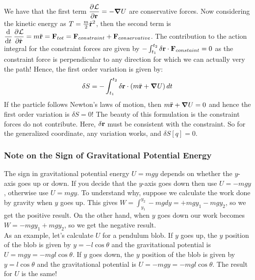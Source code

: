 We have that the first term $\dpd{\LL}{\v{r}} = -\grad{U}$ are conservative forces. Now considering the kinetic energy as $T = \frac{m}{2}\dot{\mathbf{r}}^2$, then the second term is $\dod{}{t}\dpd{\LL}{\dot{\v{r}}} = m\ddot{\v{r}} = \v{F}_{tot} = \v{F}_{constraint} + \v{F}_{conservative}$. The contribution to the action integral for the constraint forces are given by $-\int_{t_1}^{t_2}\delta\mathbf{r}\cdot\mathbf{F}_{constaint} = 0$ as the constraint force is perpendicular to any direction for which we can actually very the path! Hence, the first order variation is given by:
\[\delta S = -\int_{t_1}^{t_2}\delta\mathbf{r}\cdot\left(m\ddot{\mathbf{r}} + \grad{U}\right)dt\]
If the particle follows Newton's laws of motion, then $m\ddot{\mathbf{r}} + \grad{U} = 0$ and hence the first order variation is $\delta S = 0$! The beauty of this formulation is the constraint forces do not contribute. Here, $\delta\mathbf{r}$ must be consistent with the constraint. So for the generalized coordinate, any variation works, and $\delta S[q] = 0$.
\subsubsection{Note on the Sign of Gravitational Potential Energy}
The sign in gravitational potential energy $U=mgy$ depends on whether the $y$-axis goes up or down. If you decide that the $y$-axis goes down then use $U=-mgy$, otherwise use $U=mgy$. To understand why, suppose we calculate the work done by gravity when $y$ goes up. This gives $W = \int_{y_1}^{y_2} -mg dy = +mgy_1 - mgy_2$, so we get the positive result. On the other hand, when $y$ goes down our work becomes $W=-mgy_1 + mgy_2$, so we get the negative result. \\
As an example, let's calculate $U$ for a pendulum blob. If $y$ goes up, the $y$ position of the blob is given by $y=-l\cos\theta$ and the gravitational potential is $U=mgy=-mgl\cos\theta$. If $y$ goes down, the $y$ position of the blob is given by $y=l\cos\theta$ and the gravitational potential is $U=-mgy=-mgl\cos\theta$. The result for $U$ is the same!